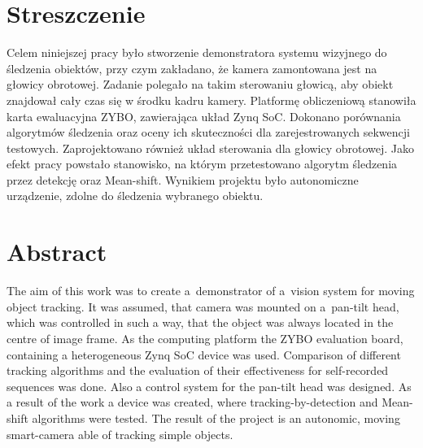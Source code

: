 \documentclass[11pt]{aghdpl}
\author{Marcin Kowalczyk}
\date{2017}
\numberwithin{equation}{section}
\begin{document}
\titlepages

{
	\fancyhf{}
	\renewcommand{\headrulewidth}{0pt}
	\renewcommand{\footrulewidth}{0pt}
}

\setcounter{tocdepth}{2}

\section*{Streszczenie}
Celem niniejszej pracy było stworzenie demonstratora systemu wizyjnego do śledzenia obiektów, przy czym zakładano, że kamera zamontowana jest na głowicy obrotowej. 
Zadanie polegało na takim sterowaniu głowicą, aby obiekt znajdował cały czas się w środku kadru kamery. 
Platformę obliczeniową stanowiła karta ewaluacyjna ZYBO, zawierająca układ Zynq SoC. 
Dokonano porównania algorytmów śledzenia oraz oceny ich skuteczności dla zarejestrowanych sekwencji testowych. 
Zaprojektowano również układ sterowania dla głowicy obrotowej. 
Jako efekt pracy powstało stanowisko, na którym przetestowano algorytm śledzenia przez detekcję oraz Mean-shift. 
Wynikiem projektu było autonomiczne urządzenie, zdolne do śledzenia wybranego obiektu.

\section*{Abstract}
The aim of this work was to create a~demonstrator of a~vision system for moving object tracking. 
It was assumed, that camera was mounted on a~pan-tilt head, which was controlled in such a way, that the object was always located in the centre of image frame. 
As the computing platform the ZYBO  evaluation board, containing a heterogeneous Zynq SoC device was used. 
Comparison of different tracking algorithms and the evaluation of their effectiveness for self-recorded sequences was done. 
Also a control system for the pan-tilt head was designed. 
As a result of the work a device was created, where tracking-by-detection and Mean-shift algorithms were tested. 
The result of the project is an autonomic, moving smart-camera able of tracking simple objects.
\clearpage

\tableofcontents
\clearpage











\appendix
{}
\printbibliography

% 




\end{document}
